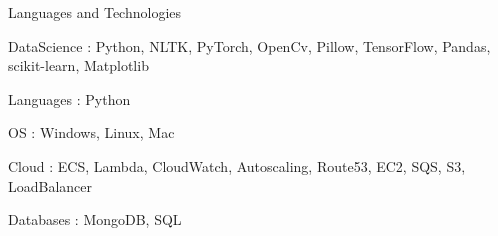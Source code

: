 

\begin{cventries}

  \cventry
    {Languages and Technologies}
    {}
    {}
    {}
    {
      \begin{cvitems} %
      \item {DataScience : Python, NLTK, PyTorch, OpenCv, Pillow, TensorFlow, Pandas, scikit-learn, Matplotlib}
      \item {Languages : Python}
	  \item {OS : Windows, Linux, Mac}	
	  \item {Cloud : ECS, Lambda, CloudWatch, Autoscaling, Route53, EC2, SQS, S3, LoadBalancer}	
	  \item {Databases : MongoDB, SQL}	
    \end{cvitems}
    }

\end{cventries}
